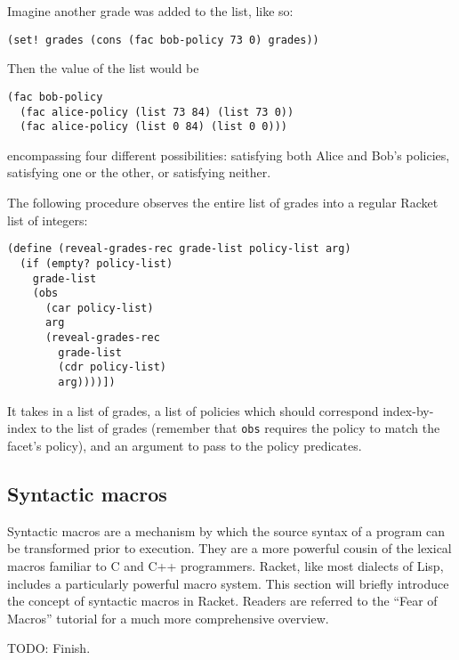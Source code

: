 \documentclass{article}
\begin{document}
Imagine another grade was added to the list, like so:

\begin{lstlisting}
(set! grades (cons (fac bob-policy 73 0) grades))
\end{lstlisting}

Then the value of the list would be

\begin{lstlisting}
(fac bob-policy
  (fac alice-policy (list 73 84) (list 73 0))
  (fac alice-policy (list 0 84) (list 0 0)))
\end{lstlisting}

encompassing four different possibilities: satisfying both Alice and Bob's policies, satisfying one or the other, or satisfying neither.

The following procedure observes the entire list of grades into a regular Racket list of integers:

\begin{lstlisting}
(define (reveal-grades-rec grade-list policy-list arg)
  (if (empty? policy-list)
    grade-list
    (obs
      (car policy-list)
      arg
      (reveal-grades-rec
        grade-list
        (cdr policy-list)
        arg))))])
\end{lstlisting}

It takes in a list of grades, a list of policies which should correspond index-by-index to the list of grades (remember that \texttt{obs} requires the policy to match the facet's policy), and an argument to pass to the policy predicates.

\subsection{Syntactic macros}
Syntactic macros are a mechanism by which the source syntax of a program can be transformed prior to execution. They are a more powerful cousin of the lexical macros familiar to C and C++ programmers. Racket, like most dialects of Lisp, includes a particularly powerful macro system. This section will briefly introduce the concept of syntactic macros in Racket. Readers are referred to the ``Fear of Macros'' tutorial \cite{fear-of-macros} for a much more comprehensive overview.

TODO: Finish.
\end{document}

